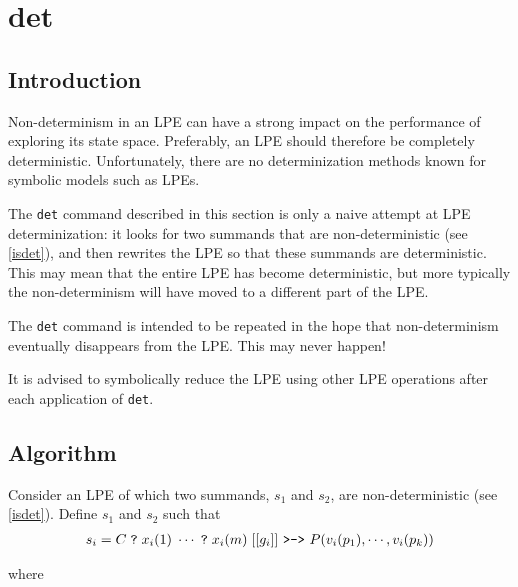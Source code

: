 \chapter{det}

\section{Introduction}

Non-determinism in an LPE can have a strong impact on the performance of exploring its state space.
Preferably, an LPE should therefore be completely deterministic.
Unfortunately, there are no determinization methods known for symbolic models such as LPEs.

The \texttt{det} command described in this section is only a naive attempt at LPE determinization: it looks for two summands that are non-deterministic (see \ref{isdet}), and then rewrites the LPE so that these summands are deterministic.
This may mean that the entire LPE has become deterministic, but more typically the non-determinism will have moved to a different part of the LPE.

The \texttt{det} command is intended to be repeated in the hope that non-determinism eventually disappears from the LPE.
This may never happen!

It is advised to symbolically reduce the LPE using other LPE operations after each application of \texttt{det}.

\section{Algorithm}

Consider an LPE of which two summands, $s_1$ and $s_2$, are non-deterministic (see \ref{isdet}).
Define $s_1$ and $s_2$ such that
\begin{align*}
s_i = C \; \texttt{?} \; x_i(1) \; \cdots{} \; \texttt{?} \; x_i(m) \; [[g_i]] \text{ \texttt{>->} } P(v_i(p_1), \cdots{}, v_i(p_k))
\end{align*}

where

